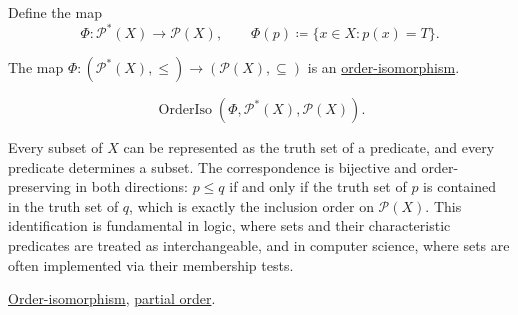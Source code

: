 Define the map
\[
\Phi : \mathcal{P}^*(X) \to \mathcal{P}(X),
\qquad
\Phi(p) \coloneqq \{x \in X : p(x) = T\}.
\]

\begin{proposition}
\label{prop:predicates-power-sets-iso}
The map $\Phi : (\mathcal{P}^*(X), \leq) \to (\mathcal{P}(X), \subseteq)$
is an \hyperref[def:order-isomorphism]{order-isomorphism}.
\end{proposition}

\begin{remark*}
\[
\operatorname{OrderIso}(\Phi, \mathcal{P}^*(X), \mathcal{P}(X)).
\]
\end{remark*}

\begin{remark*}[Interpretation]
Every subset of $X$ can be represented as the truth set of a predicate,
and every predicate determines a subset.  The correspondence is bijective
and order-preserving in both directions: $p \leq q$ if and only if the
truth set of $p$ is contained in the truth set of $q$, which is exactly
the inclusion order on $\mathcal{P}(X)$.  This identification is
fundamental in logic, where sets and their characteristic predicates are
treated as interchangeable, and in computer science, where sets are
often implemented via their membership tests.
\end{remark*}

\begin{remark*}[Dependencies]
\hyperref[def:order-isomorphism]{Order-isomorphism},
\hyperref[def:partial-order]{partial order}.
\end{remark*}

